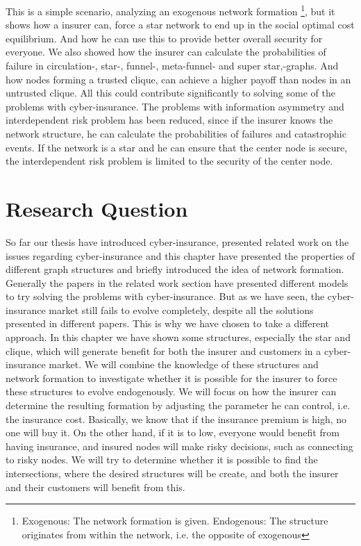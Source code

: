 This is a simple scenario, analyzing an exogenous network formation \footnote{Exogenous: The network formation is given. Endogenous: The structure originates from within the network, i.e. the opposite of exogenous}, 
but it shows how a insurer can, force a star network to end up in the social optimal cost equilibrium. And how he can use this to provide better overall security for everyone. We also showed how the insurer can calculate the probabilities of failure in circulation-, star-, funnel-, meta-funnel- and super star,-graphs.   And how nodes forming a trusted clique, can achieve a higher payoff than nodes in an untrusted clique. 
All this could contribute significantly to solving some of the problems with cyber-insurance. The problems with information asymmetry and interdependent risk problem has been reduced, since if the insurer knows the network structure, he can calculate the probabilities of failures and catastrophic events. If the network is a star and he can ensure that the center node is secure, the interdependent risk problem is limited to the security of the center node. 

\section{Research Question}
So far our thesis have introduced cyber-insurance, presented related work on the issues regarding cyber-insurance and this chapter have presented the properties of different graph structures and briefly introduced the idea of network formation. Generally the papers in the related work section have presented different models to try solving the problems with cyber-insurance. But as we have seen, the cyber-insurance market still fails to evolve completely, despite all the solutions presented in different papers. This is why we have chosen to take a different approach.
In this chapter we have shown some structures, especially the star and clique, which will generate benefit for both the insurer and customers in a cyber-insurance market. We will combine the knowledge of these structures and network formation to investigate whether it is possible for the insurer to force these structures to evolve endogenously. We will focus on how the insurer can determine the resulting formation by adjusting the parameter he can control, i.e. the insurance cost. Basically, we know that if the insurance premium is high, no one will buy it. On the other hand, if it is to low, everyone would benefit from having insurance, and insured nodes will make risky decisions, such as connecting to risky nodes. We will try to determine whether it is possible to find the intersections, where the desired structures will be create, and both the insurer and their customers will benefit from this.
